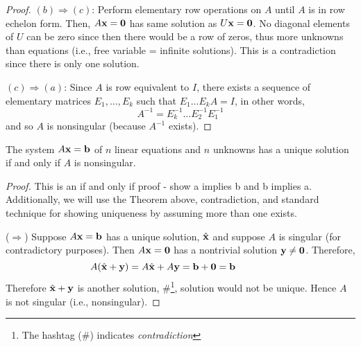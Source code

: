 \begin{enumerate}
\begin{theorem}
\begin{proof}
			
		$(b) \Rightarrow (c)$:      Perform elementary row operations on $A$ until $A$ is in row echelon form.  Then, $A {\bf x} = {\bf 0}$ has same solution as $U {\bf x} = {\bf 0}$.  No diagonal elements of $U$ can be zero since then there would be a row of zeros, thus more unknowns than equations (i.e., free variable = infinite solutions).  This is a contradiction since there is only one solution. 	
		
		
		$(c) \Rightarrow (a)$:   Since $A$ is row equivalent to $I$, there exists a sequence of elementary matrices $E_1, \dots, E_k$ such that $E_1 \dots E_k A = I$, in other words,  
		\[ A^{-1} = E_k^{-1} \dots E_2^{-1} E_1^{-1}  \]
		and so $A$ is nonsingular (because $A^{-1}$ exists).  
		
		
	\end{proof}
\end{theorem}


\begin{corollary}
	The system $A {\bf x} = {\bf b}$ of $n$ linear equations and $n$ unknowns has a unique solution if and only if $A$ is nonsingular.
	
	\begin{proof} This is an if and only if proof - show a implies b and b implies a.  Additionally, we will use the Theorem above, contradiction, and standard technique for showing uniqueness by assuming more than one exists.
	
	
	 ($\Rightarrow$) Suppose $A {\bf x} = {\bf b}$ has a unique solution, $\hat{{\bf x}}$ and suppose $A$ is singular (for contradictory purposes).  Then $A {\bf x} = {\bf 0}$ has a nontrivial solution ${\bf y} \ne {\bf 0}$.  Therefore, 
	 \[ A (\hat{{\bf x}} + {\bf y})   = A  \hat{{\bf x}}   + A {{\bf y}}   = {\bf b} +  {\bf 0} = {\bf b}   \hspace{0.5in}   \]
	 Therefore $\hat{{\bf x}} + {\bf y}$  is another solution, \#\footnote{The hashtag (\#) indicates \textit{contradiction}}, solution would not be unique. Hence $A$ is not singular (i.e., nonsingular).
	 
	 
	 

\end{proof}
\end{corollary}
\end{enumerate}
